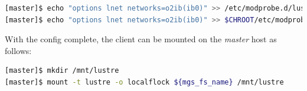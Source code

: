 \documentclass[letterpaper]{article}
\begin{document}
\begin{lstlisting}[language=bash,keywords={},upquote=true]
[master]$ echo "options lnet networks=o2ib(ib0)" >> /etc/modprobe.d/lustre.conf
[master]$ echo "options lnet networks=o2ib(ib0)" >> $CHROOT/etc/modprobe.d/lustre.conf
\end{lstlisting}

With the \Lustre{} config complete, the client can be mounted on the {\em master}
host as follows:
\begin{lstlisting}[language=bash,keywords={},upquote=true]
[master]$ mkdir /mnt/lustre
[master]$ mount -t lustre -o localflock ${mgs_fs_name} /mnt/lustre
\end{lstlisting}

\end{document}
